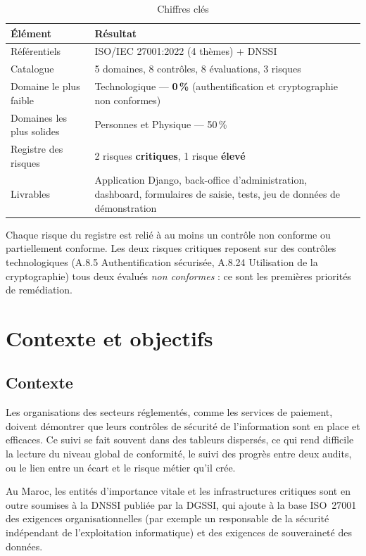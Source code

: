 \documentclass[11pt,a4paper]{article}
\newcommand{\lvl}[2]{\textcolor{#1}{\textbf{#2}}}
\begin{document}
\begin{table}[H]
\centering
\begin{tabularx}{\linewidth}{@{}lX@{}}
\toprule
\textbf{Élément} & \textbf{Résultat}\\
\midrule
Référentiels & ISO/IEC 27001:2022 (4 thèmes) + DNSSI\\
Catalogue & 5 domaines, 8 contrôles, 8 évaluations, 3 risques\\
Domaine le plus faible & Technologique --- \textbf{0\,\%} (authentification et cryptographie non conformes)\\
Domaines les plus solides & Personnes et Physique --- 50\,\%\\
Registre des risques & 2 risques \lvl{rcrit}{critiques}, 1 risque \lvl{rhigh}{élevé}\\
Livrables & Application Django, back-office d'administration, dashboard, formulaires de saisie, tests, jeu de données de démonstration\\
\bottomrule
\end{tabularx}
\caption{Chiffres clés}
\end{table}

\begin{keybox}[title=Constat principal]
Chaque risque du registre est relié à au moins un contrôle non conforme ou partiellement conforme. Les deux risques critiques reposent sur des contrôles technologiques (A.8.5 Authentification sécurisée, A.8.24 Utilisation de la cryptographie) tous deux évalués \emph{non conformes} : ce sont les premières priorités de remédiation.
\end{keybox}

\section{Contexte et objectifs}
\subsection{Contexte}
Les organisations des secteurs réglementés, comme les services de paiement, doivent démontrer que leurs contrôles de sécurité de l'information sont en place et efficaces. Ce suivi se fait souvent dans des tableurs dispersés, ce qui rend difficile la lecture du niveau global de conformité, le suivi des progrès entre deux audits, ou le lien entre un écart et le risque métier qu'il crée.

Au Maroc, les entités d'importance vitale et les infrastructures critiques sont en outre soumises à la DNSSI publiée par la DGSSI, qui ajoute à la base ISO~27001 des exigences organisationnelles (par exemple un responsable de la sécurité indépendant de l'exploitation informatique) et des exigences de souveraineté des données.
\end{document}
